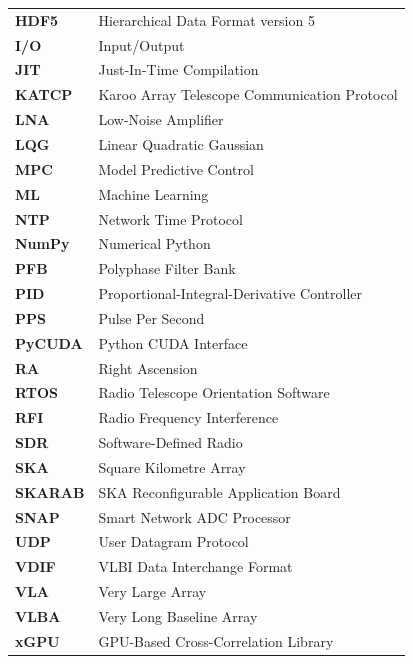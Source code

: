 \documentclass[a4paper,oneside,11pt]{book}
\begin{document}
\begin{TableOfAbbrev}
\begin{longtable}{ll}
        \textbf{HDF5} & Hierarchical Data Format version 5 \\
        \textbf{I/O} & Input/Output \\
        \textbf{JIT} & Just-In-Time Compilation \\
        \textbf{KATCP} & Karoo Array Telescope Communication Protocol \\
        \textbf{LNA} & Low-Noise Amplifier \\
        \textbf{LQG} & Linear Quadratic Gaussian \\
        \textbf{MPC} & Model Predictive Control \\
        \textbf{ML} & Machine Learning \\
        \textbf{NTP} & Network Time Protocol \\
        \textbf{NumPy} & Numerical Python \\
        \textbf{PFB} & Polyphase Filter Bank \\
        \textbf{PID} & Proportional-Integral-Derivative Controller \\
        \textbf{PPS} & Pulse Per Second \\
        \textbf{PyCUDA} & Python CUDA Interface \\
        \textbf{RA} & Right Ascension \\
        \textbf{RTOS} & Radio Telescope Orientation Software \\
        \textbf{RFI} & Radio Frequency Interference \\
        \textbf{SDR} & Software-Defined Radio \\
        \textbf{SKA} & Square Kilometre Array \\
        \textbf{SKARAB} & SKA Reconfigurable Application Board \\
        \textbf{SNAP} & Smart Network ADC Processor \\
        \textbf{UDP} & User Datagram Protocol \\
        \textbf{VDIF} & VLBI Data Interchange Format \\
        \textbf{VLA} & Very Large Array \\
        \textbf{VLBA} & Very Long Baseline Array \\
        \textbf{xGPU} & GPU-Based Cross-Correlation Library \\
    \end{longtable}
\end{TableOfAbbrev}

\end{document}
